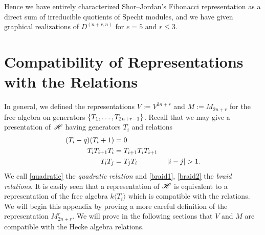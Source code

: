 \documentclass{amsart}
\begin{document}
Hence we have entirely characterized Shor--Jordan's Fibonacci representation \cite{Shor} as a direct sum of irreducible quotients of Specht modules, and we have given graphical realizations of $D^{(n+r,n)}$ for $e = 5$ and $r \leq 3$.

\newpage
\appendix
\section{Compatibility of Representations with the Relations}\label{Compatibility Section}
In general, we defined the representations $V := V^{2n + r}$ and $M := M_{2n + r}$ for the free algebra on generators $\left\{ T_1,\dots,T_{2n + r - 1} \right\}$.
Recall that we may give a presentation of $\mathscr{H}$ having generators $T_i$ and relations
\begin{align}
  (T_i - q)(T_i + 1) &= 0 \label{quadratic}\\
  T_iT_{i+1}T_i &= T_{i+1}T_iT_{i+1} \label{braid1}\\ 
  T_iT_j &= T_jT_i \hspace{40pt} \left| i - j \right| > 1. \label{braid2}
\end{align}
We call \eqref{quadratic} the \emph{quadratic relation} and \eqref{braid1}, \eqref{braid2} the \emph{braid relations}.
It is easily seen that a representation of $\mathscr{H}$ is equivalent to a representation of the free algebra $k\langle T_i \rangle$ which is compatible with the relations.
We will begin this appendix by proving a more careful definition of the representation $M_{2n + r}^r$.
We will prove in the following sections that $V$ and $M$ are compatible with the Hecke algebra relations.
\end{document}
